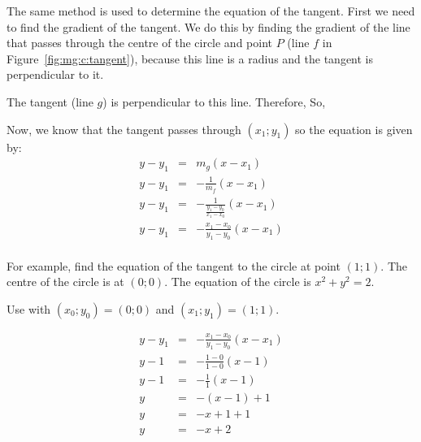 The same method is used to determine the equation of the tangent. First we need to find the gradient of the tangent. We do this by finding the gradient of the line that passes through the centre of the circle and point $P$ (line $f$ in Figure~\ref{fig:mg:c:tangent}), because this line is a radius and the tangent is perpendicular to it.


The tangent (line $g$) is perpendicular to this line. Therefore,
So,

Now, we know that the tangent passes through $(x_1;y_1)$ so the equation is given by:
\begin{eqnarray*}
y-y_1&=&m_{g}(x-x_1)\\
y-y_1&=&-\frac{1}{m_f}(x-x_1)\\
y-y_1&=&-\frac{1}{\frac{y_1-y_0}{x_1-x_0}}(x-x_1)\\
y-y_1&=&-\frac{x_1-x_0}{y_1-y_0}(x-x_1)\\
\end{eqnarray*}

For example, find the equation of the tangent to the circle at point $(1;1)$. The centre of the circle is at $(0;0)$. The equation of the circle is $x^2+y^2=2$.

Use  with $(x_0;y_0)=(0;0)$ and $(x_1;y_1)=(1;1)$.

\begin{eqnarray*}
y-y_1&=&-\frac{x_1-x_0}{y_1-y_0}(x-x_1)\\
y-1&=&-\frac{1-0}{1-0}(x-1)\\
y-1&=&-\frac{1}{1}(x-1)\\
y&=&-(x-1)+1\\
y&=&-x+1+1\\
y&=&-x+2
\end{eqnarray*}


